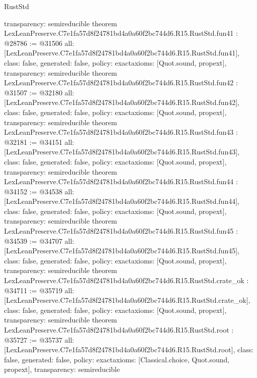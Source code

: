 \begin{lexlean}{RustStd}
\begin{coremodule}
{  transparency: semireducible
}
theorem LexLeanPreserve.C7e1fa57d8f24781bd4a0a60f2bc744d6.R15.RustStd.fun41 : @28786 := @31506 {
  all: [LexLeanPreserve.C7e1fa57d8f24781bd4a0a60f2bc744d6.R15.RustStd.fun41],
  class: false,
  generated: false,
  policy: exact{axioms: [Quot.sound, propext]},
  transparency: semireducible
}
theorem LexLeanPreserve.C7e1fa57d8f24781bd4a0a60f2bc744d6.R15.RustStd.fun42 : @31507 := @32180 {
  all: [LexLeanPreserve.C7e1fa57d8f24781bd4a0a60f2bc744d6.R15.RustStd.fun42],
  class: false,
  generated: false,
  policy: exact{axioms: [Quot.sound, propext]},
  transparency: semireducible
}
theorem LexLeanPreserve.C7e1fa57d8f24781bd4a0a60f2bc744d6.R15.RustStd.fun43 : @32181 := @34151 {
  all: [LexLeanPreserve.C7e1fa57d8f24781bd4a0a60f2bc744d6.R15.RustStd.fun43],
  class: false,
  generated: false,
  policy: exact{axioms: [Quot.sound, propext]},
  transparency: semireducible
}
theorem LexLeanPreserve.C7e1fa57d8f24781bd4a0a60f2bc744d6.R15.RustStd.fun44 : @34152 := @34538 {
  all: [LexLeanPreserve.C7e1fa57d8f24781bd4a0a60f2bc744d6.R15.RustStd.fun44],
  class: false,
  generated: false,
  policy: exact{axioms: [Quot.sound, propext]},
  transparency: semireducible
}
theorem LexLeanPreserve.C7e1fa57d8f24781bd4a0a60f2bc744d6.R15.RustStd.fun45 : @34539 := @34707 {
  all: [LexLeanPreserve.C7e1fa57d8f24781bd4a0a60f2bc744d6.R15.RustStd.fun45],
  class: false,
  generated: false,
  policy: exact{axioms: [Quot.sound, propext]},
  transparency: semireducible
}
theorem LexLeanPreserve.C7e1fa57d8f24781bd4a0a60f2bc744d6.R15.RustStd.crate_ok : @34711 := @35719 {
  all: [LexLeanPreserve.C7e1fa57d8f24781bd4a0a60f2bc744d6.R15.RustStd.crate_ok],
  class: false,
  generated: false,
  policy: exact{axioms: [Quot.sound, propext]},
  transparency: semireducible
}
theorem LexLeanPreserve.C7e1fa57d8f24781bd4a0a60f2bc744d6.R15.RustStd.root : @35727 := @35737 {
  all: [LexLeanPreserve.C7e1fa57d8f24781bd4a0a60f2bc744d6.R15.RustStd.root],
  class: false,
  generated: false,
  policy: exact{axioms: [Classical.choice, Quot.sound, propext]},
  transparency: semireducible
}


\end{coremodule}
\end{lexlean}
